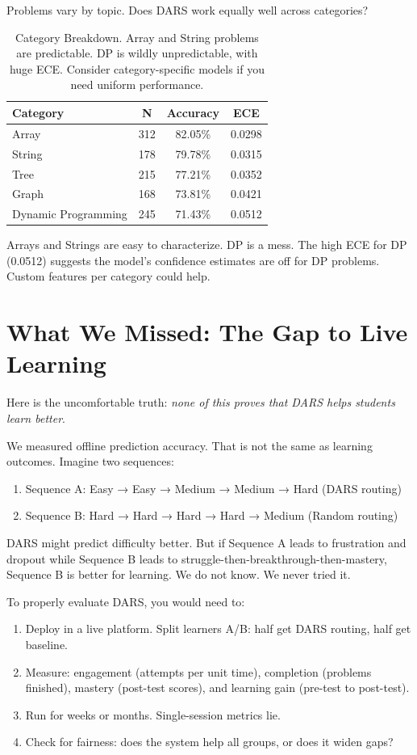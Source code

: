 \documentclass[conference]{IEEEtran}
\begin{document}
Problems vary by topic. Does DARS work equally well across categories?

\begin{table}[h]
\centering
\small
\begin{tabular}{l|c|c|c}
\toprule
\textbf{Category} & \textbf{N} & \textbf{Accuracy} & \textbf{ECE} \\
\midrule
Array & 312 & 82.05\% & 0.0298 \\
String & 178 & 79.78\% & 0.0315 \\
Tree & 215 & 77.21\% & 0.0352 \\
Graph & 168 & 73.81\% & 0.0421 \\
Dynamic Programming & 245 & 71.43\% & 0.0512 \\
\bottomrule
\end{tabular}
\caption{Category Breakdown. Array and String problems are predictable. DP is wildly unpredictable, with huge ECE. Consider category-specific models if you need uniform performance.}
\label{tab:category}
\end{table}

Arrays and Strings are easy to characterize. DP is a mess. The high ECE for DP (0.0512) suggests the model's confidence estimates are off for DP problems. Custom features per category could help.

\section{What We Missed: The Gap to Live Learning}

Here is the uncomfortable truth: \emph{none of this proves that DARS helps students learn better}. 

We measured offline prediction accuracy. That is not the same as learning outcomes. Imagine two sequences:
\begin{enumerate}
    \item Sequence A: Easy → Easy → Medium → Medium → Hard (DARS routing)
    \item Sequence B: Hard → Hard → Hard → Hard → Medium (Random routing)
\end{enumerate}

DARS might predict difficulty better. But if Sequence A leads to frustration and dropout while Sequence B leads to struggle-then-breakthrough-then-mastery, Sequence B is better for learning. We do not know. We never tried it.

To properly evaluate DARS, you would need to:
\begin{enumerate}
    \item Deploy in a live platform. Split learners A/B: half get DARS routing, half get baseline.
    \item Measure: engagement (attempts per unit time), completion (problems finished), mastery (post-test scores), and learning gain (pre-test to post-test).
    \item Run for weeks or months. Single-session metrics lie.
    \item Check for fairness: does the system help all groups, or does it widen gaps?
\end{enumerate}
\end{document}

